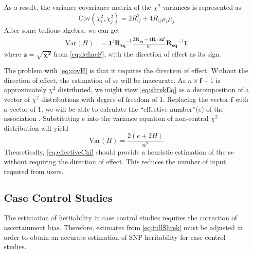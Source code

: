 			As a result, the variance covariance matrix of the $\chi^2$ variances is represented as
			\begin{equation}
				\mathrm{Cov}(\chi_i^2,\chi_j^2) = 2R_{ij}^2+4R_{ij}\mu_i\mu_j
				\label{eq:finalChi}
			\end{equation}
			After some tedious algebra, we can get 
			\begin{align}
				\mathrm{Var}(H) &=\boldsymbol{1}^t\boldsymbol{R_{sq}}^{-1}\frac{2\boldsymbol{R_{sq}}+4\boldsymbol{R}\circ \boldsymbol{zz}^t}{n^2}\boldsymbol{R_{sq}}^{-1}\boldsymbol{1}
				\label{eq:covH}
			\end{align}
			where $\boldsymbol{z} = \sqrt{\boldsymbol{\chi^2}}$ from \cref{eq:defineF}, with the direction of effect as its sign.
			 
			The problem with \cref{eq:covH} is that it requires the direction of effect. 
			Without the direction of effect, the estimation of \gls{se} will be inaccurate. 
			As $n\times \boldsymbol{f}+1$ is approximately $\chi^2$ distributed, we might view \cref{eq:shrekEq} as a decomposition of a vector of $\chi^2$ distributions with degree of freedom of 1. 
			Replacing the vector $\boldsymbol{f}$ with a vector of 1, we will be able to calculate the ``effective number''($e$) of the association \citep{Li2011}. 
			Substituting $e$ into the variance equation of non-central $\chi^2$ distribution will yield
			\begin{equation}
			\mathrm{Var}(H) = \frac{2(e+2H)}{n^2}
			\label{eq:effectiveChi}
			\end{equation}
			Theoretically, \cref{eq:effectiveChi} should provide a heuristic estimation of the \gls{se} without requiring the direction of effect.
			This reduces the number of input required from users.
			
		\subsection{Case Control Studies}	
			The estimation of heritability in case control studies requires the correction of ascertainment bias.
			Therefore, estimates from \cref{eq:fullShrek} must be adjusted in order to obtain an accurate estimation of \gls{SNP} heritability for case control studies.
			
